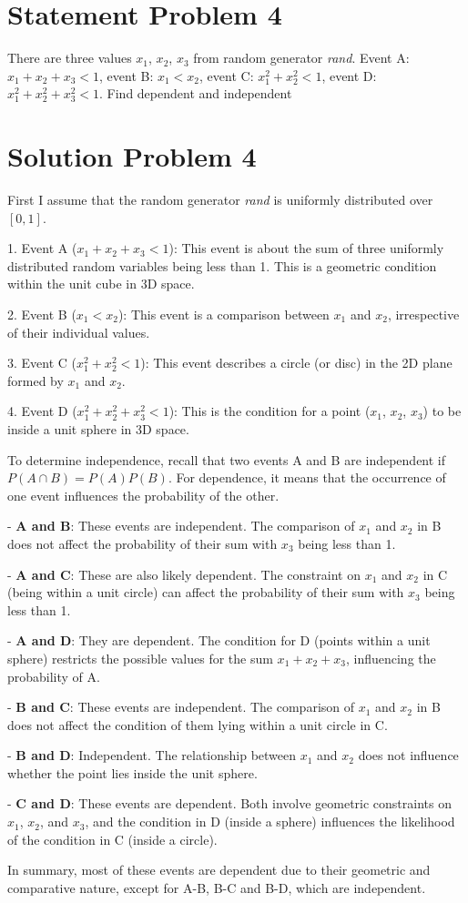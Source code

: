 \section*{Statement Problem 4}

There are three values $x_1$, $x_2$, $x_3$ from random generator \textit{rand}. Event A: $x_1 + x_2 + x_3 < 1$, event B: $x_1 < x_2$, event C: $x_1^2 + x_2^2 < 1$, event D: $x_1^2 + x_2^2 + x_3^2 < 1$. Find dependent and independent

\section*{Solution Problem 4}

First I assume that the random generator \textit{rand} is uniformly distributed over $[0, 1]$.

1. Event A (\(x_1 + x_2 + x_3 < 1\)): This event is about the sum of three uniformly distributed random variables being less than 1. This is a geometric condition within the unit cube in 3D space.

2. Event B (\(x_1 < x_2\)): This event is a comparison between \(x_1\) and \(x_2\), irrespective of their individual values.

3. Event C (\(x_1^2 + x_2^2 < 1\)): This event describes a circle (or disc) in the 2D plane formed by \(x_1\) and \(x_2\).

4. Event D (\(x_1^2 + x_2^2 + x_3^2 < 1\)): This is the condition for a point (\(x_1\), \(x_2\), \(x_3\)) to be inside a unit sphere in 3D space.

To determine independence, recall that two events A and B are independent if \(P(A \cap B) = P(A)P(B)\). For dependence, it means that the occurrence of one event influences the probability of the other.

- \textbf{A and B}: These events are independent. The comparison of \(x_1\) and \(x_2\) in B does not affect the probability of their sum with \(x_3\) being less than 1.

- \textbf{A and C}: These are also likely dependent. The constraint on \(x_1\) and \(x_2\) in C (being within a unit circle) can affect the probability of their sum with \(x_3\) being less than 1.

- \textbf{A and D}: They are dependent. The condition for D (points within a unit sphere) restricts the possible values for the sum \(x_1 + x_2 + x_3\), influencing the probability of A.

- \textbf{B and C}: These events are independent. The comparison of \(x_1\) and \(x_2\) in B does not affect the condition of them lying within a unit circle in C.

- \textbf{B and D}: Independent. The relationship between \(x_1\) and \(x_2\) does not influence whether the point lies inside the unit sphere.

- \textbf{C and D}: These events are dependent. Both involve geometric constraints on \(x_1\), \(x_2\), and \(x_3\), and the condition in D (inside a sphere) influences the likelihood of the condition in C (inside a circle).

In summary, most of these events are dependent due to their geometric and comparative nature, except for A-B, B-C and B-D, which are independent.